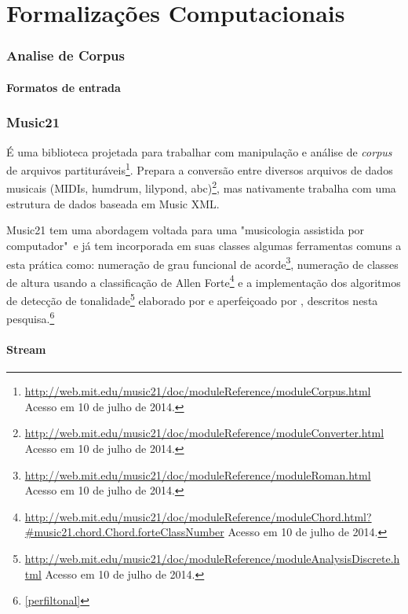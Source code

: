 \documentclass[
	12pt,				%
	openright,			%
	twoside,			%
	a4paper,			%
	english,			%
	french,				%
	spanish,			%
	brazil				%
	]{abntex2}
\begin{document}
%
%
%

\part{Formalizações Computacionais}

\section{Analise de Corpus}

\subsection{Formatos de entrada}

\section{Music21}

É uma biblioteca projetada para trabalhar com manipulação e análise de \textit{corpus} de arquivos partituráveis\footnote{\url{http://web.mit.edu/music21/doc/moduleReference/moduleCorpus.html} Acesso em 10 de julho de 2014.}. Prepara a conversão entre diversos arquivos de dados musicais (MIDIs, humdrum, lilypond, abc)\footnote{\url{http://web.mit.edu/music21/doc/moduleReference/moduleConverter.html} Acesso em 10 de julho de 2014.}, mas nativamente trabalha com uma estrutura de dados baseada em Music XML.

Music21 tem uma abordagem voltada para uma "musicologia assistida por computador"\ e já tem incorporada em suas classes algumas ferramentas comuns a esta prática como: numeração de grau funcional de acorde\footnote{\url{http://web.mit.edu/music21/doc/moduleReference/moduleRoman.html} Acesso em 10 de julho de 2014.}, numeração de classes de altura usando a classificação de Allen Forte\footnote{\url{http://web.mit.edu/music21/doc/moduleReference/moduleChord.html?\#music21.chord.Chord.forteClassNumber} Acesso em 10 de julho de 2014.} e a implementação dos algoritmos de detecção de tonalidade\footnote{\url{http://web.mit.edu/music21/doc/moduleReference/moduleAnalysisDiscrete.html} Acesso em 10 de julho de 2014.} elaborado por  e aperfeiçoado por , descritos nesta pesquisa.\footnote{\autoref{perfiltonal}}

\subsection{Stream}
\end{document}
